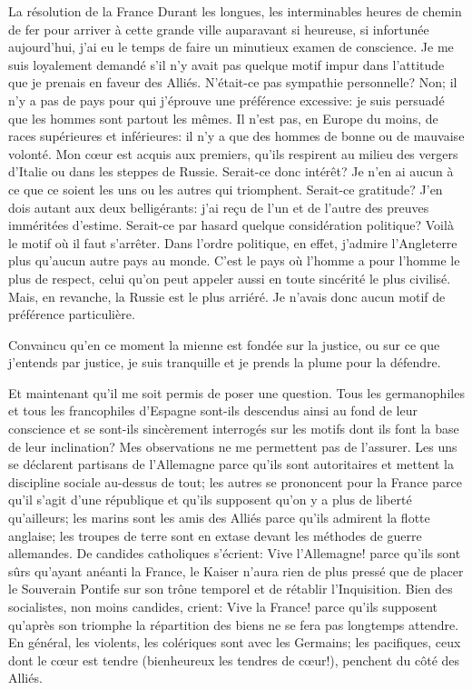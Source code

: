 \begin{chapter}{La résolution de la France}
Durant les longues, les interminables heures de chemin de fer pour
arriver à cette grande ville auparavant si heureuse, si infortunée
aujourd'hui, j'ai eu le temps de faire un minutieux examen de
conscience. Je me suis loyalement demandé s'il n'y avait pas quelque
motif impur dans l'attitude que je prenais en faveur des Alliés.
N'était-ce pas sympathie personnelle? Non; il n'y a pas de pays pour qui
j'éprouve une préférence excessive: je suis persuadé que les hommes sont
partout les mêmes. Il n'est pas, en Europe du moins, de races
supérieures et inférieures: il n'y a que des hommes de bonne ou de
mauvaise volonté. Mon cœur est acquis aux premiers, qu'ils respirent
au milieu des vergers d'Italie ou dans les steppes de Russie. Serait-ce
donc intérêt? Je n'en ai aucun à ce que ce soient les uns ou les autres
qui triomphent. Serait-ce gratitude? J'en dois autant aux deux
belligérants: j'ai reçu de l'un et de l'autre des preuves imméritées
d'estime. Serait-ce par hasard quelque considération politique? Voilà le
motif où il faut s'arrêter. Dans l'ordre politique, en effet, j'admire
l'Angleterre plus qu'aucun autre pays au monde. C'est le pays où l'homme
a pour l'homme le plus de respect, celui qu'on peut appeler aussi en
toute sincérité le plus civilisé. Mais, en revanche, la Russie est le
plus arriéré. Je n'avais donc aucun motif de préférence particulière.

Convaincu qu'en ce moment la mienne est fondée sur la justice, ou sur
ce que j'entends par justice, je suis tranquille et je prends la plume
pour la défendre.

Et maintenant qu'il me soit permis de poser une question. Tous les
germanophiles et tous les francophiles d'Espagne sont-ils descendus
ainsi au fond de leur conscience et se sont-ils sincèrement interrogés
sur les motifs dont ils font la base de leur inclination? Mes
observations ne me permettent pas de l'assurer. Les uns se déclarent
partisans de l'Allemagne parce qu'ils sont autoritaires et mettent la
discipline sociale au-dessus de tout; les autres se prononcent pour la
France parce qu'il s'agit d'une république et qu'ils supposent qu'on y a
plus de liberté qu'ailleurs; les marins sont les amis des Alliés parce
qu'ils admirent la flotte anglaise; les troupes de terre sont en extase
devant les méthodes de guerre allemandes. De candides catholiques
s'écrient: Vive l'Allemagne! parce qu'ils sont sûrs qu'ayant anéanti la
France, le Kaiser n'aura rien de plus pressé que de placer le Souverain
Pontife sur son trône temporel et de rétablir l'Inquisition. Bien des
socialistes, non moins candides, crient: Vive la France! parce qu'ils
supposent qu'après son triomphe la répartition des biens ne se fera pas
longtemps attendre. En général, les violents, les colériques sont avec
les Germains; les pacifiques, ceux dont le cœur est tendre
(bienheureux les tendres de cœur!), penchent du côté des Alliés.


\end{chapter}
